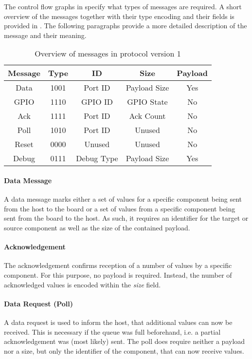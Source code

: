 \documentclass{report}
\begin{document}
The control flow graphs in  specify what types of messages are required. A short overview of the messages together with their type encoding and their fields is provided in . The following paragraphs provide a more detailed description of the message and their meaning.

\begin{table}[h]
\centering
\begin{tabular}{ c | c | c | c | c } 
Message & Type & ID & Size & Payload\\ \hline
Data & 1001 & Port ID & Payload Size & Yes\\
GPIO & 1110 & GPIO ID & GPIO State & No\\
Ack & 1111 & Port ID & Ack Count & No\\
Poll & 1010 & Port ID & Unused & No\\
Reset & 0000 & Unused & Unused & No\\
Debug & 0111 & Debug Type & Payload Size & Yes
 \end{tabular}
\caption{Overview of messages in protocol version 1}
\label{tab:protoMessages}
\end{table}

\paragraph{Data Message}
A data message marks either a set of values for a specific component being sent from the host to the board or a set of values from a specific component being sent from the board to the host. As such, it requires an identifier for the target or source component as well as the size of the contained payload.

\paragraph{Acknowledgement}
The acknowledgement confirms reception of a number of values by a specific component. For this purpose, no payload is required. Instead, the number of acknowledged values is encoded within the \textit{size} field.

\paragraph{Data Request (Poll)}
A data request is used to inform the host, that additional values can now be received. This is necessary if the queue was full beforehand, i.e. a partial acknowledgement was (most likely) sent. The poll does require neither a payload nor a size, but only the identifier of the component, that can now receive values.
\end{document}
